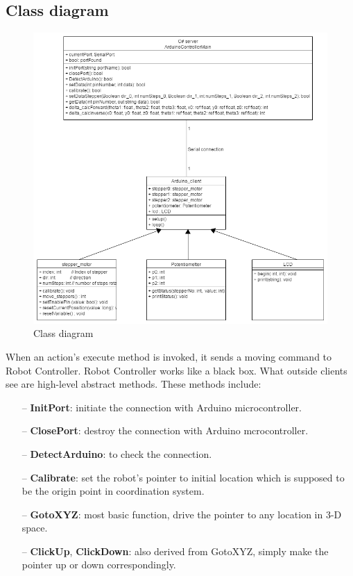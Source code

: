 \subsection{Class diagram}

\begin{figure}[H]
	\centering
	\includegraphics[width=\maxwidth{15cm}, keepaspectratio]{Chapters/Fig/class_diagram.png}
	\caption{Class diagram}
	\label{fig:class_diagram}
\end{figure}

When an action's execute method is invoked, it sends a moving command to Robot Controller. Robot Controller works like a black box. What outside clients see are high-level abstract methods. These methods include:

	\begin{itemize}
		\item[--] \textbf{InitPort}: initiate the connection with Arduino microcontroller.
		\item[--] \textbf{ClosePort}: destroy the connection with Arduino mcrocontroller.
		\item[--] \textbf{DetectArduino}: to check the connection.
		\item[--] \textbf{Calibrate}: set the robot's pointer to initial location which is supposed to be the origin point in coordination system.
		\item[--] \textbf{GotoXYZ}: most basic function, drive the pointer to any location in 3-D space.
		\item[--] \textbf{ClickUp}, \textbf{ClickDown}: also derived from GotoXYZ, simply make the pointer up or down correspondingly.
	\end{itemize}

